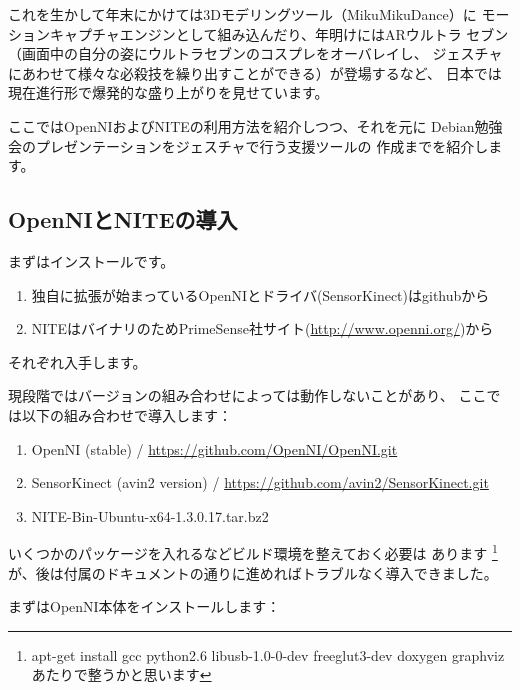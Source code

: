 \documentclass[mingoth,a4paper]{jsarticle}
\begin{document}
これを生かして年末にかけては3Dモデリングツール（MikuMikuDance）に
モーションキャプチャエンジンとして組み込んだり、年明けにはARウルトラ
セブン（画面中の自分の姿にウルトラセブンのコスプレをオーバレイし、
ジェスチャにあわせて様々な必殺技を繰り出すことができる）が登場するなど、
日本では現在進行形で爆発的な盛り上がりを見せています。

ここではOpenNIおよびNITEの利用方法を紹介しつつ、それを元に
Debian勉強会のプレゼンテーションをジェスチャで行う支援ツールの
作成までを紹介します。

\subsection{OpenNIとNITEの導入}
まずはインストールです。
\begin{enumerate}
\item 独自に拡張が始まっているOpenNIとドライバ(SensorKinect)はgithubから
\item NITEはバイナリのためPrimeSense社サイト(\url{http://www.openni.org/})から
\end{enumerate}
それぞれ入手します。

現段階ではバージョンの組み合わせによっては動作しないことがあり、
ここでは以下の組み合わせで導入します：
\begin{enumerate}
\item OpenNI (stable) / \url{https://github.com/OpenNI/OpenNI.git}
\item SensorKinect (avin2 version) / \url{https://github.com/avin2/SensorKinect.git}
\item NITE-Bin-Ubuntu-x64-1.3.0.17.tar.bz2
\end{enumerate}

いくつかのパッケージを入れるなどビルド環境を整えておく必要は
あります
\footnote{apt-get install gcc python2.6 libusb-1.0-0-dev freeglut3-dev doxygen graphviz あたりで整うかと思います}
が、後は付属のドキュメントの通りに進めればトラブルなく導入できました。

まずはOpenNI本体をインストールします：
\end{document}
